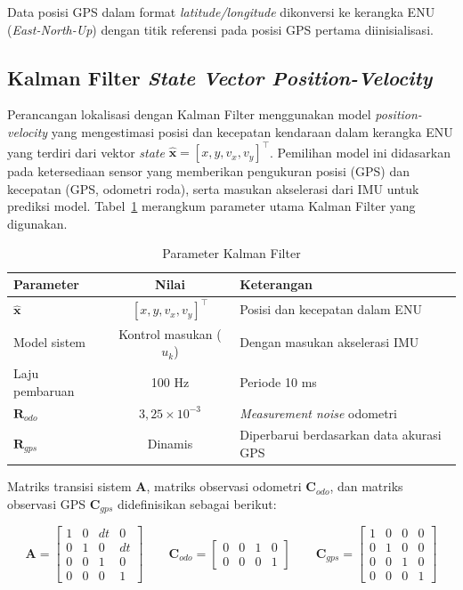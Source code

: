 Data posisi GPS dalam format \emph{latitude/longitude} dikonversi ke kerangka ENU (\emph{East-North-Up}) dengan titik referensi pada posisi GPS pertama diinisialisasi.

\subsection{Kalman Filter \emph{State Vector Position-Velocity}}

Perancangan lokalisasi dengan Kalman Filter menggunakan model \emph{position-velocity} yang mengestimasi posisi dan kecepatan kendaraan dalam kerangka ENU yang terdiri dari vektor \emph{state} $\hat{\mathbf{x}} = [x, y, v_x, v_y]^\top$.
Pemilihan model ini didasarkan pada ketersediaan sensor yang memberikan pengukuran posisi (GPS) dan kecepatan (GPS, odometri roda), serta masukan akselerasi dari IMU untuk prediksi model.
Tabel~\ref{tab:kf_params} merangkum parameter utama Kalman Filter yang digunakan.

\begin{table}[H]
\centering
\caption{Parameter Kalman Filter}
\label{tab:kf_params}
\begin{tabular}{l c l}
\hline
\textbf{Parameter} & \textbf{Nilai} & \textbf{Keterangan} \\
\hline
$\hat{\mathbf{x}}$                   & $[x, y, v_x, v_y]^\top$ & Posisi dan kecepatan dalam ENU \\
Model sistem                           & Kontrol masukan ($u_k$) & Dengan masukan akselerasi IMU \\
Laju pembaruan                         & 100 Hz & Periode 10 ms \\
$\mathbf{R}_{odo}$                     & $3{,}25\times10^{-3}$ & \emph{Measurement noise} odometri \\
$\mathbf{R}_{gps}$                     & Dinamis & Diperbarui berdasarkan data akurasi GPS \\
\hline
\end{tabular}
\end{table}

Matriks transisi sistem $\mathbf{A}$, matriks observasi odometri $\mathbf{C}_{odo}$, dan matriks observasi GPS $\mathbf{C}_{gps}$ didefinisikan sebagai berikut:

\begin{equation}
\mathbf{A} = \begin{bmatrix}
1 & 0 & dt & 0 \\
0 & 1 & 0 & dt \\
0 & 0 & 1 & 0 \\
0 & 0 & 0 & 1
\end{bmatrix}
\qquad
\mathbf{C}_{odo} = \begin{bmatrix}
0 & 0 & 1 & 0 \\
0 & 0 & 0 & 1
\end{bmatrix}
\qquad
\mathbf{C}_{gps} = \begin{bmatrix}
1 & 0 & 0 & 0 \\
0 & 1 & 0 & 0 \\
0 & 0 & 1 & 0 \\
0 & 0 & 0 & 1
\end{bmatrix}
\label{eq:kf_matrices}
\end{equation}

